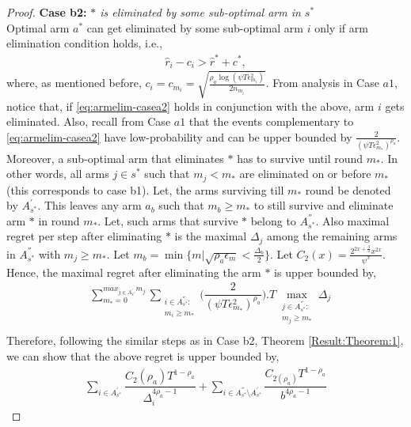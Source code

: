 \begin{proof}
\textbf{Case b2:} \textit{${*}$ is eliminated by some sub-optimal arm in $s^*$} \\
Optimal arm $a^*$ can get eliminated by some sub-optimal arm $i$ only if arm elimination condition holds, i.e., 
\begin{align*}
\hat r_{i} - c_{i} > \hat{r}^{*}+ c^{*},
\end{align*}
where, as mentioned before, $c_{i}=c_{m_{i}}=\sqrt{\frac{\rho_{a}\log (\psi T\epsilon_{m_{i}}^{2})}{2 n_{m_{i}}}}$.
From analysis in Case $a1$, notice that, if \eqref{eq:armelim-casea2} holds in conjunction with the above, arm $i$ gets eliminated. Also, recall from Case $a1$ that the events complementary to \eqref{eq:armelim-casea2} have low-probability and can be upper bounded by $\frac{2}{(\psi  T\epsilon_{m_{*}}^{2})^{\rho_{a}}}$. Moreover, a sub-optimal arm that eliminates $*$ has to survive until round $m_*$. In other words, 
all arms ${j}\in s^{*}$ such that $m_{j} < m_{*}$ are eliminated on or before $m_*$ (this corresponds to case b1). 
Let, the arms surviving till $m_{*}$ round be denoted by $A^{'}_{s^{*}}$. This leaves any arm $a_{b}$ such that $m_{b}\geq m_{*} $ to still survive and eliminate arm ${*}$ in round $m_{*}$. Let, such arms that survive ${*}$ belong to $A^{''}_{s^{*}}$. Also maximal regret per step after eliminating ${*}$ is the maximal $\Delta_{j}$ among the remaining arms in $A^{''}_{s^{*}}$ with $m_{j}\geq m_{*}$.  Let $m_{b}=\min\lbrace m|\sqrt{\rho_{a}\epsilon_{m}}<\frac{\Delta_{b}}{2}\rbrace$. Let $C_2(x) = \frac{2^{2x+\frac{3}{2}}x^{2x}}{\psi^{x}}$. Hence, the maximal regret after eliminating the arm ${*}$ is upper bounded by, 
\begin{align*}
&\sum_{m_{*}=0}^{max_{j\in A^{'}_{s^{*}}}m_{j}}\sum_{\substack{i\in A^{''}_{s^{*}}: \\ m_{i}\geq m_{*}}}\bigg(\dfrac{2}{(\psi  T\epsilon_{m_{*}}^{2})^{\rho_{a}}} \bigg).T\max_{\substack{j\in A^{''}_{s^{*}}: \\ m_{j}\geq m_{*}}}{\Delta}_{j}\\
\end{align*}
Therefore, following the similar steps as in Case b2, Theorem \ref{Result:Theorem:1}, we can show that the above regret is upper bounded by,
\begin{align*}
\sum_{i\in A^{'}_{s^{*}}}\dfrac{ C_{2}(\rho_{a}) T^{1-\rho_{a}}}{\Delta_{i}^{4\rho_{a}-1}} +\sum_{i\in A^{''}_{s^{*}}\setminus A^{'}_{s^{*}}}\dfrac{C_{2(\rho_{a})}T^{1-\rho_{a}}}{b^{4\rho_{a}-1}}
\end{align*}


\end{proof}
